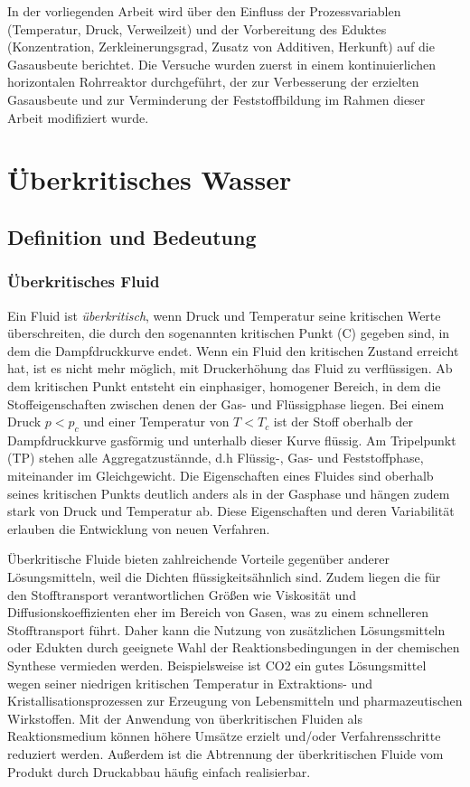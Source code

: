In der vorliegenden Arbeit wird über den Einfluss der Prozessvariablen  (Temperatur, Druck, Verweilzeit) und der Vorbereitung des Eduktes (Konzentration, Zerkleinerungsgrad, Zusatz von Additiven, Herkunft) auf die Gasausbeute berichtet. Die Versuche wurden zuerst in einem kontinuierlichen horizontalen Rohrreaktor durchgeführt, der zur Verbesserung der erzielten Gasausbeute und zur Verminderung der Feststoffbildung im Rahmen dieser Arbeit modifiziert wurde. 
\chapter{Überkritisches Wasser}
\section{Definition und Bedeutung}
\subsection{Überkritisches Fluid }
Ein Fluid ist \emph{überkritisch}, wenn Druck und Temperatur seine kritischen Werte überschreiten, die durch den sogenannten kritischen Punkt (C) gegeben sind, in dem die Dampfdruckkurve endet. Wenn ein Fluid den kritischen Zustand erreicht hat, ist es nicht mehr möglich, mit Druckerhöhung das Fluid zu verflüssigen. Ab dem kritischen Punkt entsteht ein einphasiger, homogener Bereich, in dem die Stoffeigenschaften zwischen denen der Gas- und Flüssigphase liegen.
Bei einem Druck $p < p_c$  und einer Temperatur von $T < T_c$ ist der Stoff oberhalb der Dampfdruckkurve gasförmig und unterhalb dieser Kurve flüssig. Am Tripelpunkt (TP) stehen alle Aggregatzustännde, d.h Flüssig-, Gas- und Feststoffphase, miteinander im Gleichgewicht.   
Die Eigenschaften eines Fluides sind oberhalb seines kritischen Punkts  deutlich anders als in der Gasphase und hängen zudem stark von Druck und Temperatur ab. Diese Eigenschaften und deren Variabilität erlauben die Entwicklung von neuen Verfahren.

Überkritische Fluide bieten zahlreichende Vorteile gegenüber anderer Lösungsmitteln, weil die Dichten flüssigkeitsähnlich sind. Zudem liegen die für den Stofftransport verantwortlichen Größen wie Viskosität und Diffusionskoeffizienten eher im Bereich von Gasen, was zu einem schnelleren Stofftransport führt. Daher kann die Nutzung von zusätzlichen Lösungsmitteln oder Edukten durch geeignete Wahl der Reaktionsbedingungen in der chemischen Synthese vermieden werden. Beispielsweise ist CO2 ein gutes Lösungsmittel wegen seiner niedrigen kritischen Temperatur in Extraktions- und Kristallisationsprozessen zur Erzeugung von Lebensmitteln und pharmazeutischen Wirkstoffen. Mit der Anwendung von überkritischen Fluiden als Reaktionsmedium können höhere Umsätze erzielt und/oder Verfahrensschritte reduziert werden. Außerdem ist die Abtrennung der überkritischen Fluide vom Produkt durch Druckabbau häufig einfach realisierbar. 

